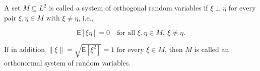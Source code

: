 A set $M \subseteq L^2$ is called a system of orthogonal random variables if $\xi \perp \eta$ for every pair $\xi, \eta \in M$ with $\xi \neq \eta$, i.e.,

$$\mathsf{E}[\xi \eta] = 0 \quad \text{for all } \xi, \eta \in M,\ \xi \neq \eta.$$

If in addition $\|\xi\| = \sqrt{\mathsf{E}[\xi^2]} = 1$ for every $\xi \in M$, then $M$ is called an orthonormal system of random variables.
